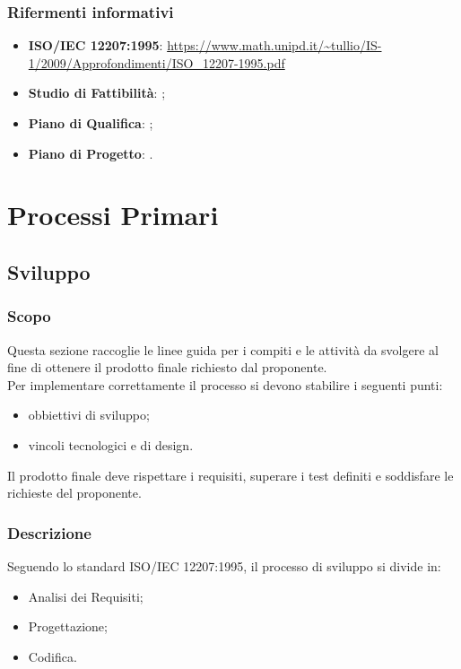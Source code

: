 \documentclass[]{article}
\begin{document}
			\subsubsection{Rifermenti informativi}
			\begin{itemize}
				\item \textbf{ISO/IEC 12207:1995}: \url{https://www.math.unipd.it/~tullio/IS-1/2009/Approfondimenti/ISO_12207-1995.pdf}
				\item \textbf{Studio di Fattibilità}: ; %
				\item \textbf{Piano di Qualifica}: ;
				\item \textbf{Piano di Progetto}: .
			\end{itemize}

		\newpage
		\section{Processi Primari}
		
		
			\newpage
			\subsection{Sviluppo}
			
				\subsubsection{Scopo}
				Questa sezione raccoglie le linee guida per i compiti e le attività da svolgere al fine di ottenere il prodotto finale richiesto dal proponente. \\
				Per implementare correttamente il processo si devono stabilire i seguenti punti:
				\begin{itemize}
					\item obbiettivi di sviluppo;
					\item vincoli tecnologici e di design.
				\end{itemize}
				Il prodotto finale deve rispettare i requisiti, superare i test definiti e soddisfare le richieste del proponente.
				\subsubsection{Descrizione}
				Seguendo lo standard ISO/IEC 12207:1995, il processo di sviluppo si divide in:
				\begin{itemize}
					\item Analisi dei Requisiti;
					\item Progettazione;
					\item Codifica.
				\end{itemize}
			
\end{document}

